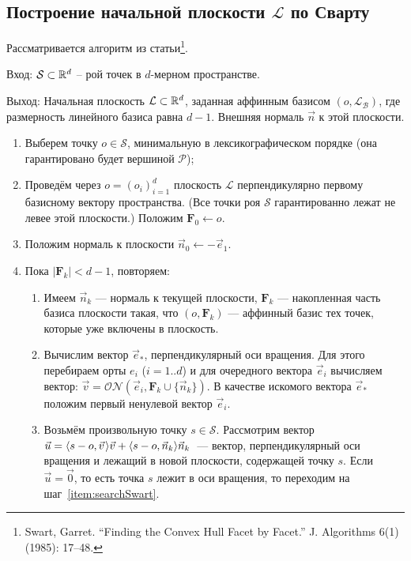 \documentclass[a4paper,12pt]{article}
\newcommand{\R}[1][]{%
  \ifthenelse{\equal{#1}{}}%
  {\mathbb{R}}%
  {\mathbb{R}^{#1}}}
\newcommand{\Swarm}{\mathcal{S}}              %
\newcommand{\Polytop}{\mathcal{P}}         %
\newcommand{\Basis}{\mathcal{B}}              %
\newcommand{\ZVec}{\vec 0}                    %
\newcommand{\set}[2][]{#1\{ #2 #1\}}                    %
\newcommand{\scalprod}[3][]{#1\langle #2, #3 #1\rangle} %
\newcommand{\ONorm}[3][]{\mathcal{ON}#1( #2, #3 #1)} %
\newcommand{\FinalVec}{\mathbf{F}} %
\newcommand{\Plane}{\mathcal{L}}           %
\renewcommand{\.}{\hspace{0.2ex}}
\begin{document}
  \subsection{Построение начальной плоскости $\Plane$ по Сварту}
    \label{InitialPlaneSwart}

    Рассматривается алгоритм из статьи\footnote{Swart, Garret. ``Finding the Convex Hull Facet by Facet.'' J. Algorithms 6(1) (1985): 17--48.}.

    Вход: $\Swarm \subset \R[d]$ -- рой точек в $d$-мерном пространстве.

    Выход: Начальная плоскость $\Plane \subset \R[d]$, заданная аффинным базисом $(o,\Plane_\Basis)$, где размерность линейного базиса равна $d-1$. Внешняя нормаль $\vec n$ к этой плоскости.

    \begin{enumerate}
      \item Выберем точку $o \in \Swarm$, минимальную в лексикографическом порядке (она гарантировано будет вершиной $\Polytop$);


      \item Проведём через $o=(o_i)_{i = 1}^{d}$ плоскость $\Plane$ перпендикулярно первому базисному вектору пространства. (Все точки роя $\Swarm$ гарантированно лежат не левее этой плоскости.) Положим $\FinalVec_0 \leftarrow o$.


      \item Положим нормаль к плоскости $\vec n_0 \leftarrow -\vec e_1$.


      \item Пока $|\FinalVec_k| < d - 1$, повторяем:


      \begin{enumerate}
        \item Имеем $\vec n_k$ --- нормаль к текущей плоскости, $\FinalVec_k$ --- накопленная часть базиса плоскости такая, что $(o, \FinalVec_k)$ --- аффинный базис тех точек, которые уже включены в плоскость.


        \item Вычислим вектор $\vec e_*$, перпендикулярный оси вращения. Для этого перебираем орты $e_i$ ($i=1..d$) и для очередного вектора $\vec e_i$ вычисляем вектор: $\vec v = \ONorm{\vec e_i}{\FinalVec_k \cup \set{\vec n_k}}$. В качестве искомого вектора $\vec e_*$ положим первый ненулевой вектор $\vec e_i$.


        \item Возьмём произвольную точку $s \in \Swarm$. Рассмотрим вектор $\vec u = \scalprod{s - o}{\vec v \.}\vec v + \scalprod{s - o}{\vec n_k}\vec n_k$~--- вектор, перпендикулярный оси вращения и лежащий в новой плоскости, содержащей точку $s$. Если $\vec u = \ZVec$, то есть точка $s$ лежит в оси вращения, то переходим на шаг~\ref{item:searchSwart}.
        \label{item:searchSwart}



\end{enumerate}
\end{enumerate}
\end{document}
